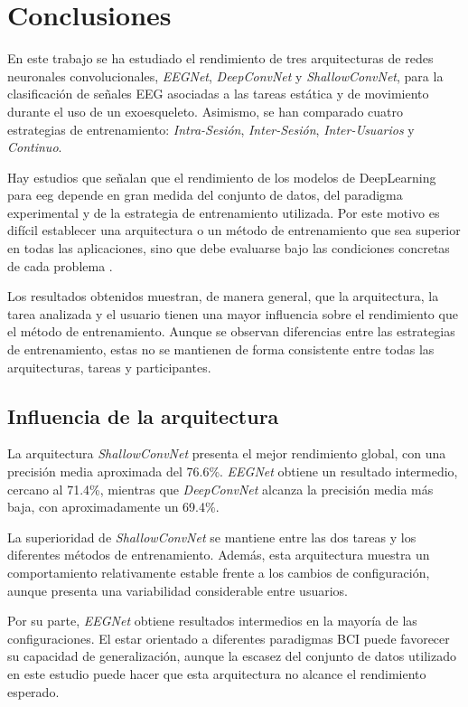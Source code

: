 \section{Conclusiones} \label{sec:conclusiones}


En este trabajo se ha estudiado el rendimiento de tres arquitecturas de redes neuronales convolucionales, \textit{EEGNet}, \textit{DeepConvNet} y \textit{ShallowConvNet}, para la clasificación de señales EEG asociadas a las tareas estática y de movimiento durante el uso de un exoesqueleto. Asimismo, se han comparado cuatro estrategias de entrenamiento: \textit{Intra-Sesión}, \textit{Inter-Sesión}, \textit{Inter-Usuarios} y \textit{Continuo}.

Hay estudios que señalan que el rendimiento de los modelos de DeepLearning para \acrshort{eeg} depende en gran medida del conjunto de datos, del paradigma experimental y de la estrategia de entrenamiento utilizada. Por este motivo es difícil establecer una arquitectura o un método de entrenamiento que sea superior en todas las aplicaciones, sino que debe evaluarse bajo las condiciones concretas de cada problema \cite{kollod_DeepComparisons2023}.

Los resultados obtenidos muestran, de manera general, que la arquitectura, la tarea analizada y el usuario tienen una mayor influencia sobre el rendimiento que el método de entrenamiento. Aunque se observan diferencias entre las estrategias de entrenamiento, estas no se mantienen de forma consistente entre todas las arquitecturas, tareas y participantes.

\subsection{Influencia de la arquitectura}

La arquitectura \textit{ShallowConvNet} presenta el mejor rendimiento global, con una precisión media aproximada del 76.6\%. \textit{EEGNet} obtiene un resultado intermedio, cercano al 71.4\%, mientras que \textit{DeepConvNet} alcanza la precisión media más baja, con aproximadamente un 69.4\%.

La superioridad de \textit{ShallowConvNet} se mantiene entre las dos tareas y los diferentes métodos de entrenamiento. Además, esta arquitectura muestra un comportamiento relativamente estable frente a los cambios de configuración, aunque presenta una variabilidad considerable entre usuarios.

Por su parte, \textit{EEGNet} obtiene resultados intermedios en la mayoría de las configuraciones. El estar orientado a diferentes paradigmas BCI puede favorecer su capacidad de generalización, aunque la escasez del conjunto de datos utilizado en este estudio puede hacer que esta arquitectura no alcance el rendimiento esperado.

